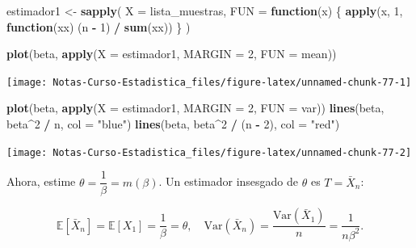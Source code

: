 \documentclass[
  12pt,
]{book}
\newenvironment{Shaded}{\begin{snugshade}}{\end{snugshade}}
\newcommand{\ControlFlowTok}[1]{\textcolor[rgb]{0.13,0.29,0.53}{\textbf{#1}}}
\newcommand{\DataTypeTok}[1]{\textcolor[rgb]{0.13,0.29,0.53}{#1}}
\newcommand{\DecValTok}[1]{\textcolor[rgb]{0.00,0.00,0.81}{#1}}
\newcommand{\KeywordTok}[1]{\textcolor[rgb]{0.13,0.29,0.53}{\textbf{#1}}}
\newcommand{\NormalTok}[1]{#1}
\newcommand{\OperatorTok}[1]{\textcolor[rgb]{0.81,0.36,0.00}{\textbf{#1}}}
\newcommand{\StringTok}[1]{\textcolor[rgb]{0.31,0.60,0.02}{#1}}
\begin{document}
\begin{Shaded}
\begin{Highlighting}[]
\NormalTok{estimador1 \textless{}{-}}\StringTok{ }\KeywordTok{sapply}\NormalTok{(}
  \DataTypeTok{X =}\NormalTok{ lista\_muestras,}
  \DataTypeTok{FUN =} \ControlFlowTok{function}\NormalTok{(x) \{}
    \KeywordTok{apply}\NormalTok{(x, }\DecValTok{1}\NormalTok{, }\ControlFlowTok{function}\NormalTok{(xx) (n }\OperatorTok{{-}}\StringTok{ }\DecValTok{1}\NormalTok{) }\OperatorTok{/}\StringTok{ }\KeywordTok{sum}\NormalTok{(xx))}
\NormalTok{  \}}
\NormalTok{)}

\KeywordTok{plot}\NormalTok{(beta, }\KeywordTok{apply}\NormalTok{(}\DataTypeTok{X =}\NormalTok{ estimador1, }\DataTypeTok{MARGIN =} \DecValTok{2}\NormalTok{, }\DataTypeTok{FUN =}\NormalTok{ mean))}
\end{Highlighting}
\end{Shaded}

\begin{center}\texttt{[image: Notas-Curso-Estadistica\_files/figure-latex/unnamed-chunk-77-1]} \end{center}

\begin{Shaded}
\begin{Highlighting}[]
\KeywordTok{plot}\NormalTok{(beta, }\KeywordTok{apply}\NormalTok{(}\DataTypeTok{X =}\NormalTok{ estimador1, }\DataTypeTok{MARGIN =} \DecValTok{2}\NormalTok{, }\DataTypeTok{FUN =}\NormalTok{ var))}
\KeywordTok{lines}\NormalTok{(beta, beta}\OperatorTok{\^{}}\DecValTok{2} \OperatorTok{/}\StringTok{ }\NormalTok{n, }\DataTypeTok{col =} \StringTok{"blue"}\NormalTok{)}
\KeywordTok{lines}\NormalTok{(beta, beta}\OperatorTok{\^{}}\DecValTok{2} \OperatorTok{/}\StringTok{ }\NormalTok{(n }\OperatorTok{{-}}\StringTok{ }\DecValTok{2}\NormalTok{), }\DataTypeTok{col =} \StringTok{"red"}\NormalTok{)}
\end{Highlighting}
\end{Shaded}

\begin{center}\texttt{[image: Notas-Curso-Estadistica\_files/figure-latex/unnamed-chunk-77-2]} \end{center}

Ahora, estime \(\theta = \dfrac 1\beta = m(\beta)\). Un estimador insesgado de \(\theta\) es \(T =\bar X_n\):

\[\mathbb E[\bar X_n] = \mathbb E
[X_1] = \dfrac 1\beta  = \theta, \quad \text{Var}(\bar X_n) = \dfrac{\text{Var}(\bar X_1) }{n} = \dfrac 1{n\beta^2}.\]
\end{document}
